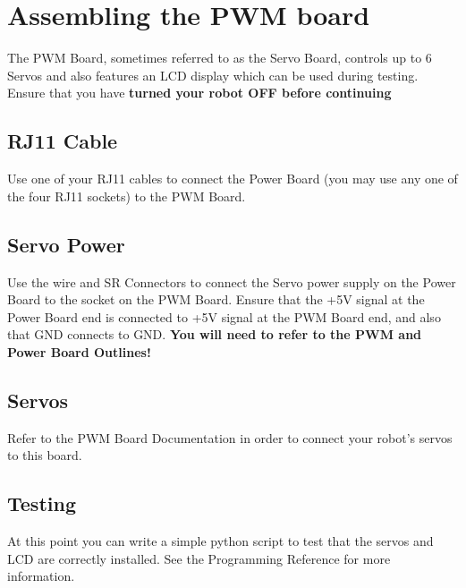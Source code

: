 \section{Assembling the PWM board}
The PWM Board, sometimes referred to as the Servo Board, controls up to 6 Servos and also features an LCD display which can be used during testing. Ensure that you have {\bf turned your robot OFF before continuing}

\subsection{RJ11 Cable}
Use one of your RJ11 cables to connect the Power Board (you may use any one of the four RJ11 sockets) to the PWM Board.

\subsection{Servo Power}
Use the wire and SR Connectors to connect the Servo power supply on the Power Board to the socket on the PWM Board. Ensure that the +5V signal at the Power Board end is connected to +5V signal at the PWM Board end, and also that GND connects to GND. {\bf You will need to refer to the PWM and Power Board Outlines!}

\subsection{Servos}
Refer to the PWM Board Documentation in order to connect your robot's servos to this board.

\subsection{Testing}
At this point you can write a simple python script to test that the servos and LCD are correctly installed. See the Programming Reference for more information.


 

